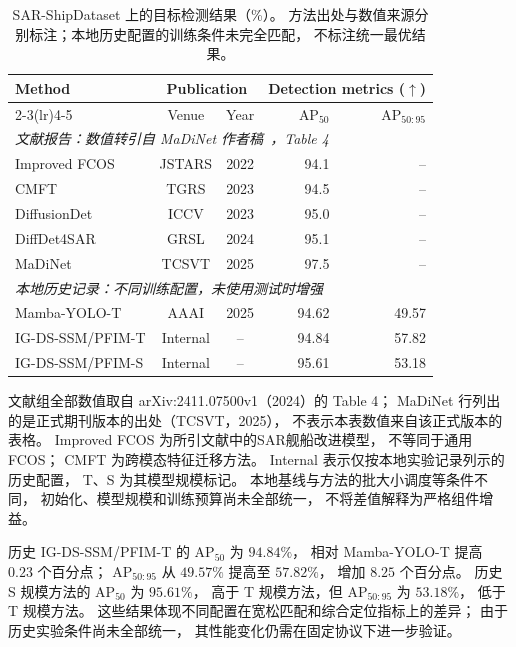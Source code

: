 \begin{table}[!t]
\centering
\small
\setlength{\tabcolsep}{5pt}
\renewcommand{\arraystretch}{1.10}
\caption{SAR-ShipDataset 上的目标检测结果（\%）。
方法出处与数值来源分别标注；本地历史配置的训练条件未完全匹配，
不标注统一最优结果。}
\label{tab:sarship_detection_comparison}
\begin{tabular*}{\textwidth}{@{\extracolsep{\fill}}lccrr}
\toprule
\multirow{2}{*}{Method}
& \multicolumn{2}{c}{Publication}
& \multicolumn{2}{c}{Detection metrics ($\uparrow$)} \\
\cmidrule(lr){2-3}\cmidrule(lr){4-5}
& Venue & Year & AP$_{50}$ & AP$_{50:95}$ \\
\midrule
\multicolumn{5}{l}{\textit{文献报告：数值转引自 MaDiNet 作者稿~\cite{madinet_preprint}，Table 4}} \\
Improved FCOS~\cite{improvedfcos2022}
& JSTARS & 2022
& 94.1 & -- \\
CMFT~\cite{cmft2023}
& TGRS & 2023
& 94.5 & -- \\
DiffusionDet~\cite{diffusiondet2023}
& ICCV & 2023
& 95.0 & -- \\
DiffDet4SAR~\cite{diffdet4sar2024}
& GRSL & 2024
& 95.1 & -- \\
MaDiNet~\cite{madinet2025}
& TCSVT & 2025
& 97.5 & -- \\
\midrule
\multicolumn{5}{l}{\textit{本地历史记录：不同训练配置，未使用测试时增强}} \\
Mamba-YOLO-T~\cite{mambayolo2024}
& AAAI & 2025
& 94.62 & 49.57 \\
IG-DS-SSM/PFIM-T
& Internal & --
& 94.84 & 57.82 \\
IG-DS-SSM/PFIM-S
& Internal & --
& 95.61 & 53.18 \\
\bottomrule
\end{tabular*}
\smallskip
\begin{minipage}{\linewidth}
\footnotesize
文献组全部数值取自 arXiv:2411.07500v1（2024）的 Table 4；
MaDiNet 行列出的是正式期刊版本的出处（TCSVT，2025），
不表示本表数值来自该正式版本的表格。
Improved FCOS 为所引文献中的SAR舰船改进模型，
不等同于通用FCOS；
CMFT 为跨模态特征迁移方法。
Internal 表示仅按本地实验记录列示的历史配置，
T、S 为其模型规模标记。
本地基线与方法的批大小调度等条件不同，
初始化、模型规模和训练预算尚未全部统一，
不将差值解释为严格组件增益。
\end{minipage}
\end{table}

历史 IG-DS-SSM/PFIM-T 的 AP$_{50}$ 为 $94.84\%$，
相对 Mamba-YOLO-T 提高 $0.23$ 个百分点；
AP$_{50:95}$ 从 $49.57\%$ 提高至 $57.82\%$，
增加 $8.25$ 个百分点。
历史 S 规模方法的 AP$_{50}$ 为 $95.61\%$，
高于 T 规模方法，但 AP$_{50:95}$ 为 $53.18\%$，
低于 T 规模方法。
这些结果体现不同配置在宽松匹配和综合定位指标上的差异；
由于历史实验条件尚未全部统一，
其性能变化仍需在固定协议下进一步验证。

\FloatBarrier

